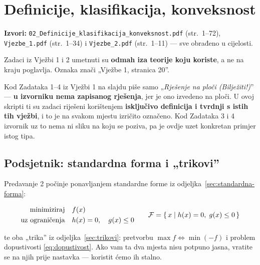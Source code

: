 \chapter{Definicije, klasifikacija, konveksnost}
\label{ch:definicije}

\begin{izvor}
\textbf{Izvori:} \texttt{02\_Definicije\_klasifikacija\_konveksnost.pdf}
(str.\ 1--72), \texttt{Vjezbe\_1.pdf} (str.\ 1--34) i \texttt{Vjezbe\_2.pdf}
(str.\ 1--11) --- sve obrađeno u cijelosti.

Zadaci iz Vježbi 1 i 2 umetnuti su \textbf{odmah iza teorije koju koriste}, a
ne na kraju poglavlja. Oznaka  znači „Vježbe 1, stranica 20”.
\end{izvor}

\begin{napomena}
Kod Zadataka 1--4 iz Vježbi 1 na slajdu piše samo „\emph{Rješenje na ploči
(Bilježiti!)}” --- \textbf{u izvorniku nema zapisanog rješenja}, jer je ono
izvedeno na ploči. U ovoj skripti ti su zadaci riješeni korištenjem
\textbf{isključivo definicija i tvrdnji s istih tih vježbi}, i to je na svakom
mjestu izričito označeno. Kod Zadataka 3 i 4 izvornik uz to nema ni sliku na
koju se poziva, pa je ovdje uzet konkretan primjer istog tipa.
\end{napomena}

\section{Podsjetnik: standardna forma i „trikovi”}

Predavanje 2 počinje ponavljanjem standardne forme iz
odjeljka~\ref{sec:standardna-forma}:

\begin{equation}
\begin{aligned}
\minim & f(x) \\
\uzogr & h(x) = 0, \quad g(x) \le 0
\end{aligned}
\qquad
\Feas = \{\, x \mid h(x) = 0,\; g(x) \le 0 \,\}
\end{equation}

te oba „trika” iz odjeljka~\ref{sec:trikovi}: pretvorbu
$\max f \Leftrightarrow \min(-f)$ i problem dopustivosti
\eqref{eq:dopustivost}. Ako vam ta dva mjesta nisu potpuno jasna, vratite se na
njih prije nastavka --- koristit ćemo ih stalno.

